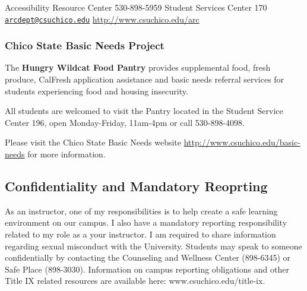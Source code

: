\documentclass[11pt,]{article}
\begin{document}
Accessibility Resource Center 530-898-5959 Student Services Center 170
\href{mailto:arcdept@csuchico.edu}{\nolinkurl{arcdept@csuchico.edu}}
\url{http://www.csuchico.edu/arc}

\hypertarget{chico-state-basic-needs-project}{%
\subsubsection{Chico State Basic Needs
Project}\label{chico-state-basic-needs-project}}

The \textbf{Hungry Wildcat Food Pantry} provides supplemental food,
fresh produce, CalFresh application assistance and basic needs referral
services for students experiencing food and housing insecurity.

All students are welcomed to visit the Pantry located in the Student
Service Center 196, open Monday-Friday, 11am-4pm or call 530-898-4098.

Please visit the Chico State Basic Needs website
\url{http://www.csuchico.edu/basic-needs} for more information.

\hypertarget{confidentiality-and-mandatory-reoprting}{%
\subsection{Confidentiality and Mandatory
Reoprting}\label{confidentiality-and-mandatory-reoprting}}

As an instructor, one of my responsibilities is to help create a safe
learning environment on our campus. I also have a mandatory reporting
responsibility related to my role as a your instructor. I am required to
share information regarding sexual misconduct with the University.
Students may speak to someone confidentially by contacting the
Counseling and Wellness Center (898-6345) or Safe Place (898-3030).
Information on campus reporting obligations and other Title IX related
resources are available here: www.csuchico.edu/title-ix.
\end{document}
